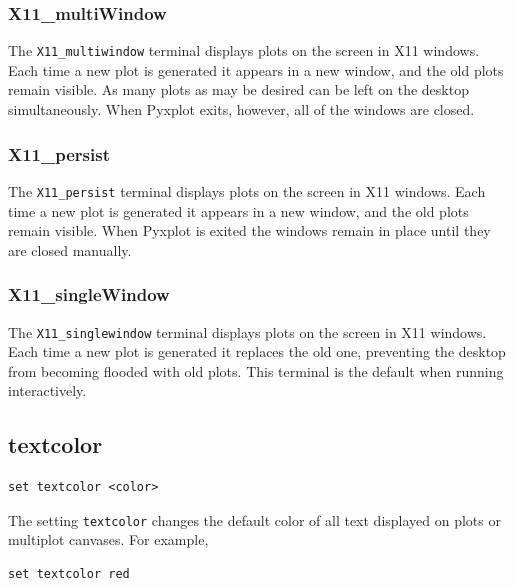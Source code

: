 \subsubsection{X11\_multiWindow}

The {\tt X11\_multiwindow} terminal displays plots on the screen in X11
windows. Each time a new plot is generated it appears in a new window, and the
old plots remain visible.  As many plots as may be desired can be left on the
desktop simultaneously. When Pyxplot exits, however, all of the windows are
closed.

\subsubsection{X11\_persist}

The {\tt X11\_persist} terminal displays plots on the screen in X11 windows.
Each time a new plot is generated it appears in a new window, and the old plots
remain visible.  When Pyxplot is exited the windows remain in place until they
are closed manually.

\subsubsection{X11\_singleWindow}

The {\tt X11\_singlewindow} terminal displays plots on the screen in X11
windows. Each time a new plot is generated it replaces the old one, preventing
the desktop from becoming flooded with old plots. This terminal is the default
when running interactively.


\subsection{textcolor}

\begin{verbatim}
set textcolor <color>
\end{verbatim}

The setting {\tt textcolor} changes the default color of all text displayed
on plots or multiplot canvases.  For example,

\begin{verbatim}
set textcolor red
\end{verbatim}


